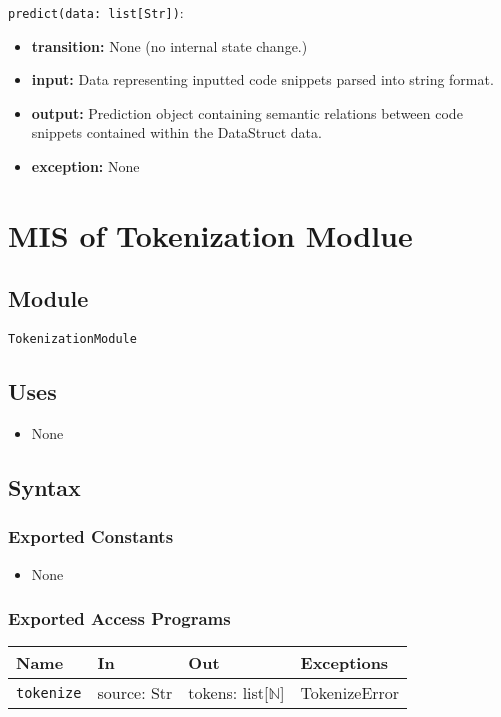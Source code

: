 \documentclass[12pt, titlepage]{article}
\begin{document}
\begin{itemize}
\noindent \texttt{predict(data: list[Str])}:
\begin{itemize}
    \item \textbf{transition:} None (no internal state change.)
    \item \textbf{input:} Data representing inputted code snippets parsed into string format.
    \item \textbf{output:} Prediction object containing semantic relations between code snippets contained within the DataStruct data.
    \item \textbf{exception:} None
\end{itemize}


\section{MIS of Tokenization Modlue} \label{smTokenization}

\subsection{Module}

\texttt{TokenizationModule}

\subsection{Uses}

\begin{itemize}
    \item None
\end{itemize}

\subsection{Syntax}

\subsubsection{Exported Constants}

\begin{itemize}
    \item None
\end{itemize}

\subsubsection{Exported Access Programs}

\begin{center}
\begin{tabular}{p{5cm} p{3.5cm} p{3.5cm} p{2cm}}
\hline
\textbf{Name} & \textbf{In} & \textbf{Out} & \textbf{Exceptions} \\
\hline
\texttt{tokenize} & source: Str & tokens: list[$\mathbb{N}$] & TokenizeError \\
\hline
\end{tabular}
\end{center}


\end{itemize}
\end{document}
